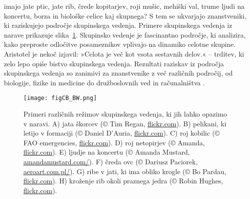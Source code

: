 









\begin{razsirjeniPovzetek}

 imajo jate ptic, jate rib, črede kopitarjev, roji mušic, mehiški val, trume ljudi na koncertu, borza in biološke celice kaj skupnega? S tem se ukvarjajo znanstveniki, ki raziskujejo področje skupinskega vedenja. Primere skupinskega vedenja iz narave prikazuje slika~\ref{fig:CB_si}. Skupinsko vedenje je fascinantno področje, ki analizira, kako preproste odločitve posameznikov vplivajo na dinamiko celotne skupine. Aristotel je nekoč izjavil: »Celota je več kot vsota sestavnih delov.« -- trditev, ki zelo lepo opiše bistvo skupinskega vedenja. Rezultati raziskav iz področja skupinskega vedenja so zanimivi za znanstvenike z več različnih področij, od biologije, fizike in medicine do družboslovnih ved in računalništva \cite{deisboeck2009collective,lebarbajec2009organized,nahin2012chases,silverberg2013collective,spector2003emergence,sumpter2006principles,vicsek1995novel,wei2009pursuit,xu2014crowd}.

\begin{figure}[p]
	\texttt{[image: figCB\_BW.png]}
	\caption{Primeri različnih režimov skupinskega vedenja, ki jih lahko opazimo v naravi. A) jata škorcev (© Tim Regan, \href{www.flickr.com}{flickr.com}). B) pelikani, ki letijo v formaciji (© Daniel D'Auria, \href{www.flickr.com}{flickr.com}). C) roj kobilic (© FAO emergencies, \href{www.flickr.com}{flickr.com}). D) roj netopirjev (© Amanda, \href{www.flickr.com}{flickr.com}). E) ljudje na koncertu (© Amanda Mustard, \href{http://www.amandamustard.com/}{amandamustard.com/}). F) čreda ovc (© Dariusz Paciorek, \href{http://www.aeroart.com.pl/}{aeroart.com.pl/}). G) ribe v jati, ki ima obliko krogle (© Bo Pardau, \href{www.flickr.com}{flickr.com}). H) kroženje rib okoli praznega jedra (© Robin Hughes, \href{www.flickr.com}{flickr.com}).}
	\label{fig:CB_si}
\end{figure}


\end{razsirjeniPovzetek}
